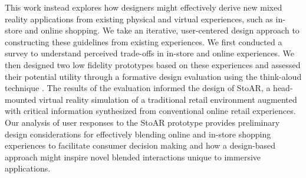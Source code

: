 

This work instead explores how designers might effectively derive new mixed reality applications from existing physical and virtual experiences, such as in-store and online shopping.  
We take  an iterative, user-centered design approach to constructing these  guidelines from existing experiences. We first conducted a survey to understand perceived trade-offs in in-store and online experiences.  We then designed two low fidelity prototypes based on these experiences and assessed their potential utility through a formative design evaluation using the think-aloud technique . The results of the evaluation informed the design of StoAR, a head-mounted virtual reality simulation of a traditional retail environment augmented with critical information  synthesized from conventional online retail experiences. Our analysis of user responses to the StoAR prototype  provides preliminary design considerations for effectively blending online and in-store shopping experiences to facilitate consumer decision making and how a design-based approach might inspire novel blended interactions unique to immersive applications.
